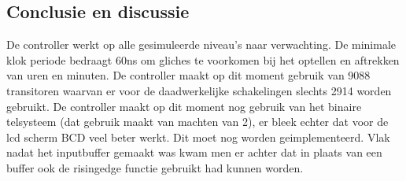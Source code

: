 \subsection{Conclusie en discussie}
De controller werkt op alle gesimuleerde niveau's naar verwachting. 
De minimale klok periode bedraagt 60ns om gliches te voorkomen bij het optellen en aftrekken van uren en minuten. 
De controller maakt op dit moment gebruik van 9088 transitoren waarvan er voor de daadwerkelijke schakelingen slechts 2914 worden gebruikt. 
De controller maakt op dit moment nog gebruik van het binaire telsysteem (dat gebruik maakt van machten van 2), er bleek echter dat voor de lcd scherm BCD veel beter werkt. Dit moet nog worden geimplementeerd. Vlak nadat het inputbuffer gemaakt was kwam men er achter dat in plaats van een buffer ook de rising\textunderscore edge functie gebruikt had kunnen worden. 

